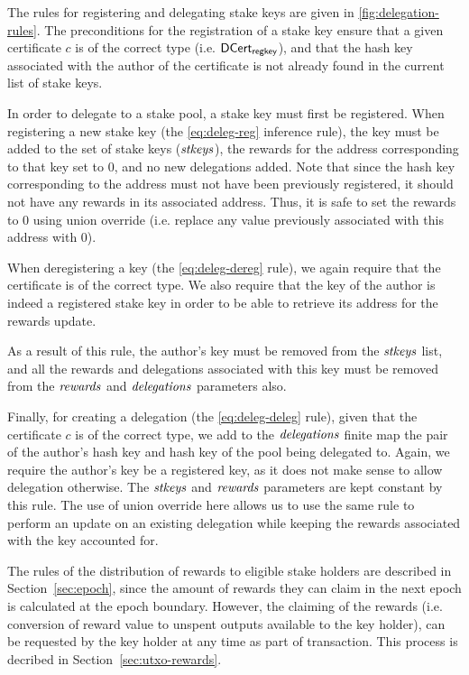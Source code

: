 The rules for registering and delegating stake keys are given in
\cref{fig:delegation-rules}. The preconditions for the registration of a stake
key ensure that a given certificate $c$ is of the correct type
(i.e. $\mathsf{DCert_{regkey}}$),
and that the hash key associated with the author of the certificate is not
already found in the current list of stake keys.

In order to delegate to a stake pool, a stake key must first be registered.
When registering a new stake key (the \cref{eq:deleg-reg} inference rule),
the key must be
added to the set of stake keys ($\mathit{stkeys}$), the rewards for the address
corresponding to that key set to 0, and no new delegations added. Note that
since the hash key corresponding to the address must not have been previously
registered,
it should not have any rewards in its associated address. Thus, it is safe
to set the rewards to 0 using union override (i.e. replace any value previously
associated with this address with 0).

When deregistering a key (the \cref{eq:deleg-dereg} rule), we again
require that the certificate is of the correct type. We also require
that the key of the author is indeed a registered stake key
in order to be able to retrieve its address for the rewards update.

As a result of this rule, the author's key must be removed from the $\mathit{stkeys}$ list,
and all the rewards and delegations associated with this key must be removed
from the $\mathit{rewards}$ and $\mathit{delegations}$ parameters also.

Finally, for creating a delegation (the \cref{eq:deleg-deleg} rule),
given that the certificate $c$ is of the correct type, we add to the
$\mathit{delegations}$ finite map the pair of
the author's hash key and hash key of the pool being delegated to.
Again, we require the author's key be a registered key, as it does not make
sense to allow delegation otherwise.
The $\mathit{stkeys}$ and $\mathit{rewards}$ parameters are kept constant by
this rule. The use of union override here allows us to use the same rule
to perform an update on an existing delegation while keeping the rewards
associated with the key accounted for.

The rules of the distribution of rewards to eligible stake holders are described
in Section~\ref{sec:epoch}, since the amount of rewards they can claim in the next
epoch is calculated at the epoch boundary. However, the claiming of the rewards
(i.e. conversion of reward value to unspent outputs available to the key
holder), can be requested by the key holder at any time as part of transaction.
This process is decribed in Section~\ref{sec:utxo-rewards}.

